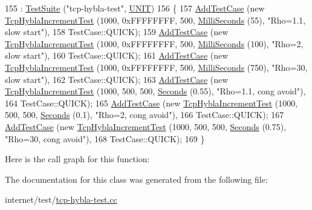 \begin{DoxyCode}
155                        : \hyperlink{classns3_1_1TestSuite_a904b0c40583b744d30908aeb94636d1a}{TestSuite} (\textcolor{stringliteral}{"tcp-hybla-test"}, \hyperlink{classns3_1_1TestSuite_a1ebfcab34ec8161e085e8e3a1855eae0a3885375a3787abf60431f8454b3cadbd}{UNIT})
156   \{
157     \hyperlink{classns3_1_1TestCase_a3718088e3eefd5d6454569d2e0ddd835}{AddTestCase} (\textcolor{keyword}{new} \hyperlink{classTcpHyblaIncrementTest}{TcpHyblaIncrementTest} (1000, 0xFFFFFFFF, 500, 
      \hyperlink{group__timecivil_gaf26127cf4571146b83a92ee18679c7a9}{MilliSeconds} (55), \textcolor{stringliteral}{"Rho=1.1, slow start"}),
158                  TestCase::QUICK);
159     \hyperlink{classns3_1_1TestCase_a3718088e3eefd5d6454569d2e0ddd835}{AddTestCase} (\textcolor{keyword}{new} \hyperlink{classTcpHyblaIncrementTest}{TcpHyblaIncrementTest} (1000, 0xFFFFFFFF, 500, 
      \hyperlink{group__timecivil_gaf26127cf4571146b83a92ee18679c7a9}{MilliSeconds} (100), \textcolor{stringliteral}{"Rho=2, slow start"}),
160                  TestCase::QUICK);
161     \hyperlink{classns3_1_1TestCase_a3718088e3eefd5d6454569d2e0ddd835}{AddTestCase} (\textcolor{keyword}{new} \hyperlink{classTcpHyblaIncrementTest}{TcpHyblaIncrementTest} (1000, 0xFFFFFFFF, 500, 
      \hyperlink{group__timecivil_gaf26127cf4571146b83a92ee18679c7a9}{MilliSeconds} (750), \textcolor{stringliteral}{"Rho=30, slow start"}),
162                  TestCase::QUICK);
163     \hyperlink{classns3_1_1TestCase_a3718088e3eefd5d6454569d2e0ddd835}{AddTestCase} (\textcolor{keyword}{new} \hyperlink{classTcpHyblaIncrementTest}{TcpHyblaIncrementTest} (1000, 500, 500, 
      \hyperlink{group__timecivil_ga33c34b816f8ff6628e33d5c8e9713b9e}{Seconds} (0.55), \textcolor{stringliteral}{"Rho=1.1, cong avoid"}),
164                  TestCase::QUICK);
165     \hyperlink{classns3_1_1TestCase_a3718088e3eefd5d6454569d2e0ddd835}{AddTestCase} (\textcolor{keyword}{new} \hyperlink{classTcpHyblaIncrementTest}{TcpHyblaIncrementTest} (1000, 500, 500, 
      \hyperlink{group__timecivil_ga33c34b816f8ff6628e33d5c8e9713b9e}{Seconds} (0.1), \textcolor{stringliteral}{"Rho=2, cong avoid"}),
166                  TestCase::QUICK);
167     \hyperlink{classns3_1_1TestCase_a3718088e3eefd5d6454569d2e0ddd835}{AddTestCase} (\textcolor{keyword}{new} \hyperlink{classTcpHyblaIncrementTest}{TcpHyblaIncrementTest} (1000, 500, 500, 
      \hyperlink{group__timecivil_ga33c34b816f8ff6628e33d5c8e9713b9e}{Seconds} (0.75), \textcolor{stringliteral}{"Rho=30, cong avoid"}),
168                  TestCase::QUICK);
169   \}
\end{DoxyCode}


Here is the call graph for this function\+:




The documentation for this class was generated from the following file\+:\begin{DoxyCompactItemize}
\item 
internet/test/\hyperlink{tcp-hybla-test_8cc}{tcp-\/hybla-\/test.\+cc}\end{DoxyCompactItemize}
